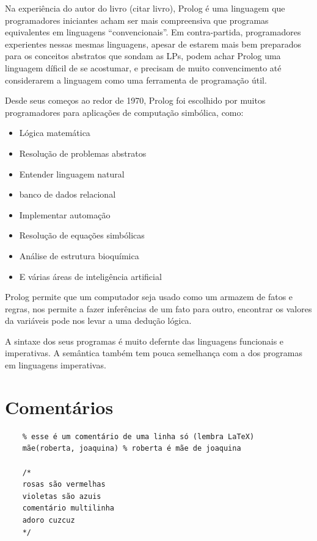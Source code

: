 
Na experiência do autor do livro (citar livro), Prolog é uma linguagem que
programadores iniciantes acham ser mais compreensiva que programas equivalentes
em linguagens ``convencionais''. Em contra-partida, programadores experientes
nessas mesmas linguagens, apesar de estarem mais bem preparados para os
conceitos abstratos que sondam as LPs, podem achar Prolog uma linguagem díficil
de se acostumar, e precisam de muito convencimento até considerarem a linguagem
como uma ferramenta de programação útil.

Desde seus começos ao redor de 1970, Prolog foi escolhido por muitos
programadores para aplicações de computação simbólica, como:

\begin{itemize}
    \item Lógica matemática
    \item Resolução de problemas abstratos
    \item Entender linguagem natural
    \item banco de dados relacional
    \item Implementar automação
    \item Resolução de equações simbólicas
    \item Análise de estrutura bioquímica
    \item E várias áreas de inteligência artificial
\end{itemize}

Prolog permite que um computador seja usado como um armazem de fatos e regras,
nos permite a fazer inferências de um fato para outro, encontrar os valores da
variáveis pode nos levar a uma dedução lógica.

A sintaxe dos seus programas é muito defernte das linguagens funcionais e
imperativas. A semântica também tem pouca semelhança com a dos programas em
linguagens imperativas.


\section{Comentários}
\begin{verbatim}
    % esse é um comentário de uma linha só (lembra LaTeX)
    mãe(roberta, joaquina) % roberta é mãe de joaquina

    /*
    rosas são vermelhas
    violetas são azuis
    comentário multilinha
    adoro cuzcuz
    */
\end{verbatim}

